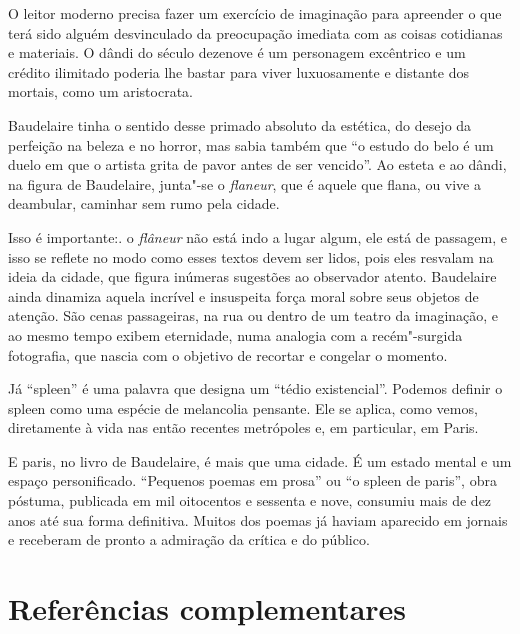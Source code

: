 \documentclass[12pt]{extarticle}
\begin{document}


O leitor moderno precisa fazer um exercício de imaginação para apreender
o que terá sido alguém desvinculado da preocupação imediata com as
coisas cotidianas e materiais.
O dândi do século dezenove é um personagem excêntrico e um crédito
ilimitado poderia lhe bastar para viver luxuosamente e distante dos
mortais, como um aristocrata.

Baudelaire tinha o sentido desse primado absoluto da estética, do
desejo da perfeição na beleza e no horror, mas sabia também que ``o
estudo do belo é um duelo em que o artista grita de pavor antes de ser
vencido''.
Ao esteta e ao dândi, na figura de Baudelaire, junta"-se o \textit{flaneur},
que é aquele que flana, ou vive a deambular, caminhar sem rumo pela
cidade.

Isso é importante:. o \textit{flâneur} não está indo a lugar algum, ele está de
passagem, e isso se reflete no modo como esses textos devem ser lidos,
pois eles resvalam na ideia da cidade, que figura inúmeras sugestões ao observador atento.
Baudelaire ainda dinamiza aquela incrível e insuspeita força moral sobre
seus objetos de atenção.
São cenas passageiras, na rua ou dentro de um teatro da imaginação, e
ao mesmo tempo exibem eternidade, numa analogia com a recém"-surgida
fotografia, que nascia com o objetivo de recortar e congelar o
momento.

Já ``spleen'' é uma palavra que designa um ``tédio existencial''.
Podemos definir o spleen como uma espécie de melancolia pensante.
Ele se aplica, como vemos, diretamente à vida nas então recentes
metrópoles e, em particular, em Paris.




E paris, no livro de Baudelaire, é mais que uma cidade. É um estado
mental e um espaço personificado.
``Pequenos poemas em prosa'' ou ``o spleen de paris'', obra póstuma,
publicada em mil oitocentos e sessenta e nove, consumiu mais de dez
anos até sua forma definitiva.
Muitos dos poemas já haviam aparecido em jornais e receberam de pronto a
admiração da crítica e do público.

\section{Referências complementares}
\end{document}
